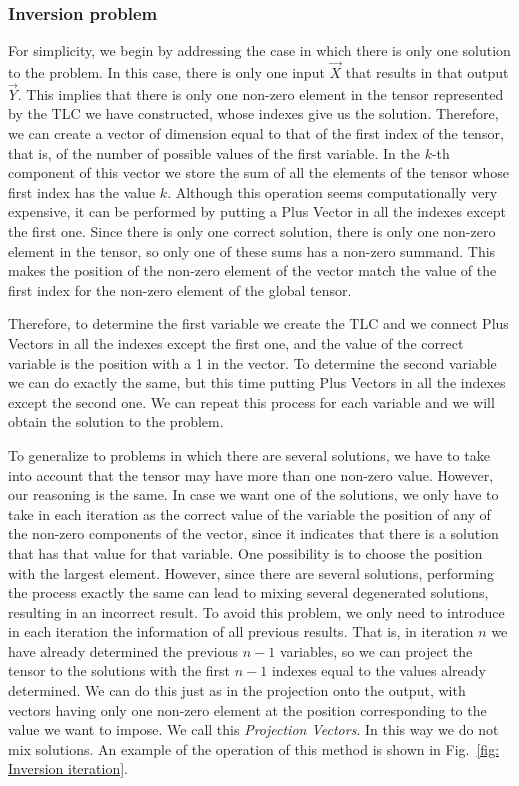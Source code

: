 \subsubsection{Inversion problem}
For simplicity, we begin by addressing the case in which there is only one solution to the problem. In this case, there is only one input $\vec{X}$ that results in that output $\vec{Y}$. This implies that there is only one non-zero element in the tensor represented by the TLC we have constructed, whose indexes give us the solution. Therefore, we can create a vector of dimension equal to that of the first index of the tensor, that is, of the number of possible values of the first variable. In the $k$-th component of this vector we store the sum of all the elements of the tensor whose first index has the value $k$. Although this operation seems computationally very expensive, it can be performed by putting a Plus Vector in all the indexes except the first one. Since there is only one correct solution, there is only one non-zero element in the tensor, so only one of these sums has a non-zero summand. This makes the position of the non-zero element of the vector match the value of the first index for the non-zero element of the global tensor.

Therefore, to determine the first variable we create the TLC and we connect Plus Vectors in all the indexes except the first one, and the value of the correct variable is the position with a 1 in the vector. To determine the second variable we can do exactly the same, but this time putting Plus Vectors in all the indexes except the second one. We can repeat this process for each variable and we will obtain the solution to the problem.

To generalize to problems in which there are several solutions, we have to take into account that the tensor may have more than one non-zero value. However, our reasoning is the same. In case we want one of the solutions, we only have to take in each iteration as the correct value of the variable the position of any of the non-zero components of the vector, since it indicates that there is a solution that has that value for that variable. One possibility is to choose the position with the largest element. However, since there are several solutions, performing the process exactly the same can lead to mixing several degenerated solutions, resulting in an incorrect result. To avoid this problem, we only need to introduce in each iteration the information of all previous results. That is, in iteration $n$ we have already determined the previous $n-1$ variables, so we can project the tensor to the solutions with the first $n-1$ indexes equal to the values already determined. We can do this just as in the projection onto the output, with vectors having only one non-zero element at the position corresponding to the value we want to impose. We call this \textit{Projection Vectors}. In this way we do not mix solutions. An example of the operation of this method is shown in Fig.~\ref{fig: Inversion iteration}.

